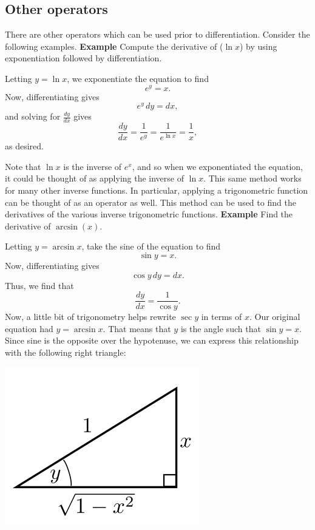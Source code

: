\documentclass[twoside,openright,titlepage,a4paper]{book}
\begin{document}
\begin{sloppypar}
\subsection{Other operators}
There are other operators which can be used prior to differentiation. Consider the following examples.
\bigbreak
\textbf{Example} Compute the derivative of ($\ln x$) by using exponentiation followed by differentiation. 
\begin{examplebox}
Letting $y = \ln x$, we exponentiate the equation to find \[ e^y = x. \]
Now, differentiating gives \[ e^y \, dy = dx, \] and solving for $\frac{dy}{dx}$ gives \[ \frac{dy}{dx} = \frac{1}{e^y} = \frac{1}{e^{\ln x}} = \frac{1}{x}, \] as desired.	
\end{examplebox}

Note that $\ln x$ is the inverse of $e^x$, and so when we exponentiated the equation, it could be thought of as applying the inverse of $\ln x$. This same method works for many other inverse functions. In particular, applying a trigonometric function can be thought of as an operator as well. This method can be used to find the derivatives of the various inverse trigonometric functions.
\bigbreak
\textbf{Example} Find the derivative of $\arcsin(x)$.
\begin{examplebox}
Letting $y = \arcsin x$, take the sine of the equation to find \[ \sin y = x. \]
Now, differentiating gives \[ \cos y \, dy = dx. \]
Thus, we find that \[ \frac{dy}{dx} = \frac{1}{\cos y}. \]
Now, a little bit of trigonometry helps rewrite $\sec y$ in terms of $x$. Our original equation had $y = \arcsin x$. That means that $y$ is the angle such that $\sin y = x$. Since sine is the opposite over the hypotenuse, we can express this relationship with the following right triangle:
\begin{center}\includegraphics[scale=0.6]{SinTrig}\end{center}

\end{examplebox}
\end{sloppypar}
\end{document}
